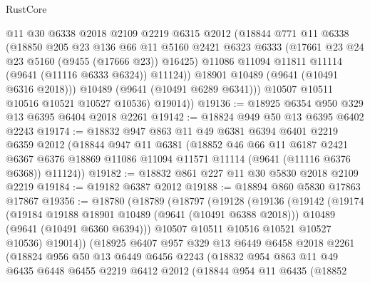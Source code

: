 \begin{lexlean}{RustCore}
\begin{coremodule}
              @11
              @30
              @6338
              @2018
              @2109
              @2219
              @6315
              @2012
              (@18844
                @771
                @11
                @6338
                (@18850
                  @205
                  @23
                  @136
                  @66
                  @11
                  @5160
                  @2421
                  @6323
                  @6333
                  (@17661 @23 @24 @23 @5160 (@9455 (@17666 @23)) @16425)
                  @11086
                  @11094
                  @11811
                  @11114
                  (@9641 (@11116 @6333 @6324))
                  @11124))
              @18901
              @10489
              (@9641 (@10491 @6316 @2018)))
            @10489
            (@9641 (@10491 @6289 @6341)))
          @10507
          @10511
          @10516
          @10521
          @10527
          @10536)
        @19014))
@19136 := @18925 @6354 @950 @329 @13 @6395 @6404 @2018 @2261
@19142 := @18824 @949 @50 @13 @6395 @6402 @2243
@19174 := @18832
    @947
    @863
    @11
    @49
    @6381
    @6394
    @6401
    @2219
    @6359
    @2012
    (@18844
      @947
      @11
      @6381
      (@18852
        @46
        @66
        @11
        @6187
        @2421
        @6367
        @6376
        @18869
        @11086
        @11094
        @11571
        @11114
        (@9641 (@11116 @6376 @6368))
        @11124))
@19182 := @18832 @861 @227 @11 @30 @5830 @2018 @2109 @2219
@19184 := @19182 @6387 @2012
@19188 := @18894 @860 @5830 @17863 @17867
@19356 := @18780
    (@18789
      (@18797
        (@19128
          (@19136
            (@19142
              (@19174
                (@19184 @19188 @18901 @10489 (@9641 (@10491 @6388 @2018)))
                @10489
                (@9641 (@10491 @6360 @6394)))
              @10507
              @10511
              @10516
              @10521
              @10527
              @10536)
            @19014))
        (@18925
          @6407
          @957
          @329
          @13
          @6449
          @6458
          @2018
          @2261
          (@18824
            @956
            @50
            @13
            @6449
            @6456
            @2243
            (@18832
              @954
              @863
              @11
              @49
              @6435
              @6448
              @6455
              @2219
              @6412
              @2012
              (@18844
                @954
                @11
                @6435
                (@18852

\end{coremodule}
\end{lexlean}
